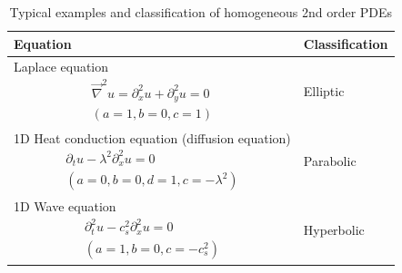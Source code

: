 \begin{table}[!htb]
    \centering
    \begin{tabular}{|p{}|p{}|}
    \hline
    \textcolor{blue1}{Equation} & \textcolor{blue1}{Classification} \\
    \hline
    \hline
    Laplace equation
    \begin{equation}
        \begin{gathered}
            \vec{\nabla}^2 u = \partial_x^2 u + \partial_y^2 u = 0 \\
            (a = 1, b = 0, c = 1)
        \end{gathered}
    \end{equation} & Elliptic \\
    \hline
    1D Heat conduction equation (diffusion equation)
    \begin{equation}
        \begin{gathered}
            \partial_t u - \lambda^2 \partial_x^2 u = 0 \\
            (a = 0, b = 0, d = 1, c = -\lambda^2)
        \end{gathered}
    \end{equation} & Parabolic \\
    \hline
    1D Wave equation
    \begin{equation}
        \begin{gathered}
            \partial_t^2 u - c_s^2 \partial_x^2 u = 0 \\
            (a = 1, b = 0, c = -c_s^2)
        \end{gathered}
    \end{equation} & Hyperbolic \\
    \hline
    \end{tabular}
    \caption{Typical examples and classification of homogeneous 2nd order PDEs}
    \label{tab:2nd_order_pdes}
\end{table}


